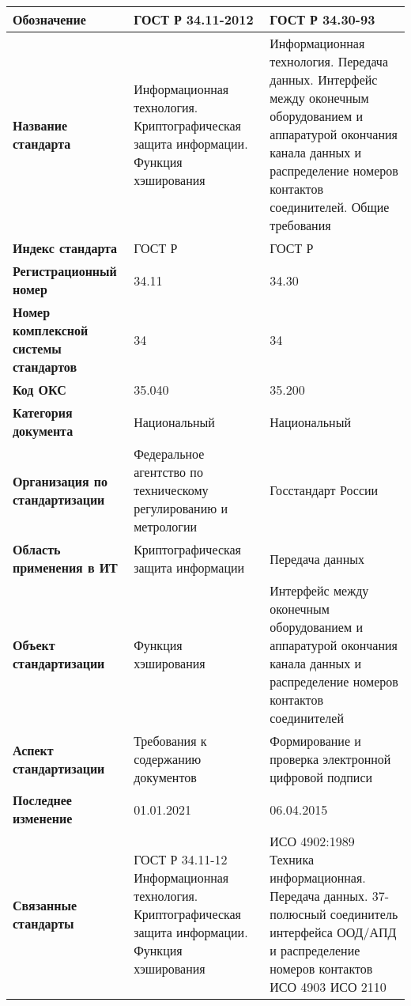 \begin{table}[h!tp]
	\small
	\centering
	\caption{}
	\label{table:national}
	\begin{tabular}{|p{10em}|p{14em}|p{14em}|}
		\hline
		\textbf{Обозначение}
			& \textbf{ГОСТ Р 34.11-2012} & \textbf{ГОСТ Р 34.30-93} \\ \hline
		\textbf{Название стандарта}
			& Информационная технология. Криптографическая защита информации. Функция хэширования
			& Информационная технология. Передача данных. Интерфейс между оконечным оборудованием и аппаратурой окончания канала данных и распределение номеров контактов соединителей. Общие требования \\ \hline
		\textbf{Индекс стандарта}
			& ГОСТ Р & ГОСТ Р \\ \hline
		\textbf{Регистрационный номер}
			& 34.11 & 34.30 \\ \hline
		\textbf{Номер комплексной системы стандартов}
			& 34 & 34 \\ \hline
		\textbf{Код ОКС}
			& 35.040 & 35.200 \\ \hline
		\textbf{Категория документа}
			& Национальный & Национальный \\ \hline
		\textbf{Организация по стандартизации}
			& Федеральное агентство по техническому регулированию и метрологии
			& Госстандарт России  \\ \hline
		\textbf{Область применения в ИТ}
			& Криптографическая защита информации
			& Передача данных \\ \hline
		\textbf{Объект стандартизации}
			& Функция хэширования
			& Интерфейс между оконечным оборудованием и аппаратурой окончания канала данных и распределение номеров контактов соединителей \\ \hline
		\textbf{Аспект стандартизации}
			& Требования к содержанию документов
			& Формирование и проверка электронной цифровой подписи \\ \hline
		\textbf{Последнее изменение}
			& 01.01.2021 & 06.04.2015 \\ \hline
		\textbf{Связанные стандарты}
			& ГОСТ Р 34.11-12  Информационная технология. Криптографическая защита информации. Функция хэширования
			& ИСО  4902:1989 Техника информационная. Передача данных. 37-полюсный соединитель интерфейса ООД/АПД и распределение номеров контактов ИСО 4903  ИСО 2110 \\ \hline
	\end{tabular}
\end{table}

